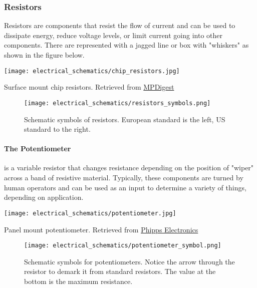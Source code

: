         \subsubsection*{Resistors} 
        Resistors are components that resist the flow of current and can be used to dissipate energy, reduce voltage levels, or limit current going into other components.
        There are represented with a jagged line or box with "whiskers" as shown in the figure below.

        \begin{marginfigure}[-1in]
            \texttt{[image: electrical\_schematics/chip\_resistors.jpg]}
            \caption[Chip Resistors]{Surface mount chip resistors. 
            Retrieved from \href{https://www.mpdigest.com/2018/01/24/thick-film-chip-resistors/}{MPDigest}}
        \end{marginfigure}

        \begin{figure}[h!]
            \texttt{[image: electrical\_schematics/resistors\_symbols.png]}
            \caption[Resistor Symbols]{Schematic symbols of resistors. 
            European standard is the left, US standard to the right.}
        \end{figure}

        \paragraph*{The Potentiometer} is a variable resistor that changes resistance depending on the position of "wiper" across a band of resistive material.
        Typically, these components are turned by human operators and can be used as an input to determine a variety of things, depending on application.

        \begin{marginfigure}[-1in]
            \texttt{[image: electrical\_schematics/potentiometer.jpg]}
            \caption{Panel mount potentiometer.
            Retrieved from \href{https://www.phippselectronics.com/product/10k-potentiometer-panel-mount-breadboard-friendly-pack-of-2/}{Phipps Electronics}}
        \end{marginfigure}

        \begin{figure}[h!]
            \texttt{[image: electrical\_schematics/potentiometer\_symbol.png]}
            \caption[Potentiometer Symbol]{Schematic symbols for potentiometers. Notice the arrow through the resistor to demark it from standard resistors. The value at the bottom is the maximum resistance.}
        \end{figure}

